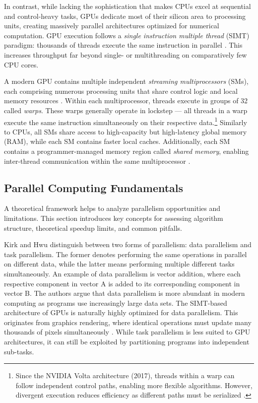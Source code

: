 \documentclass[english,12pt,a4paper,pdftex,sci,utf8]{aaltothesis}
\begin{document}
In contrast, while lacking the sophistication that makes CPUs excel at sequential and control-heavy tasks, GPUs dedicate most of their silicon area to processing units, creating massively parallel architectures optimized for numerical computation. GPU execution follows a \emph{single instruction multiple thread} (SIMT) paradigm: thousands of threads execute the same instruction in parallel \cite{cuda2025guide}. This increases throughput far beyond single- or multithreading on comparatively few CPU cores.

A modern GPU contains multiple independent \emph{streaming multiprocessors} (SMs), each comprising numerous processing units that share control logic and local memory resources \cite{kirk2016programming, cuda2025guide}. Within each multiprocessor, threads execute in groups of 32 called \emph{warps}. These warps generally operate in lockstep --- all threads in a warp execute the same instruction simultaneously on their respective data.\footnote{Since the NVIDIA Volta architecture (2017), threads within a warp can follow independent control paths, enabling more flexible algorithms. However, divergent execution reduces efficiency as different paths must be serialized \cite{cuda2025guide}.} Similarly to CPUs, all SMs share access to high-capacity but high-latency global memory (RAM), while each SM contains faster local caches. Additionally, each SM contains a programmer-managed memory region called \emph{shared memory}, enabling inter-thread communication within the same multiprocessor \cite{sanders2010cuda, cuda2025guide}.
\clearpage

\subsection{Parallel Computing Fundamentals}\label{subsec:parallell}

A theoretical framework helps to analyze parallelism opportunities and limitations. This section introduces key concepts for assessing algorithm structure, theoretical speedup limits, and common pitfalls.

Kirk and Hwu \cite{kirk2016programming} distinguish between two forms of parallelism: data parallelism and task parallelism. The former denotes performing the same operations in parallel on different data, while the latter means performing multiple different tasks simultaneously. An example of data parallelism is vector addition, where each respective component in vector A is added to its corresponding component in vector B. The authors argue that data parallelism is more abundant in modern computing as programs use increasingly large data sets. The SIMT-based architecture of GPUs is naturally highly optimized for data parallelism. This originates from graphics rendering, where identical operations must update many thousands of pixels simultaneously \cite{sanders2010cuda}.  While task parallelism is less suited to GPU architectures, it can still be exploited by partitioning programs into independent sub-tasks.
\end{document}
